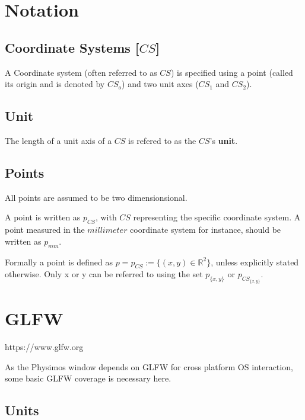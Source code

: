 \documentclass[12pt]{article}
\begin{document}
\tableofcontents

\bigskip
\bigskip
\bigskip

\pagebreak


\section{Notation}

\subsection{Coordinate Systems [$CS$]}

A Coordinate system (often referred to as $CS$) is specified using a point (called its origin and is denoted by $CS_o$) and two unit axes ($CS_1$ and $CS_2$). 


\subsection{Unit}

The length of a unit axis of a $CS$ is refered to as the $CS$'s \textbf{unit}.


\subsection{Points}

All points are assumed to be two dimensionsional.

A point is written as $p_{CS}$, with $CS$ representing the specific coordinate system. A point measured in the $millimeter$ coordinate system for instance, should be written as  $p_{mm}$.

Formally a point is defined as $p = p_{CS} := \{(x, y) \in \mathbb{R}^2\}$, unless explicitly stated otherwise. Only x or y can be referred to using the set $p_{\{x, y\}}$ or $p_{CS_{\{x, y\}}}$.

\section{GLFW}

https://www.glfw.org

As the Physimos window depends on GLFW for cross platform OS interaction, some basic GLFW coverage is necessary here.

\subsection{Units}
\end{document}

